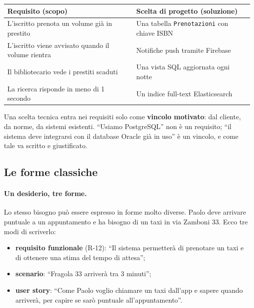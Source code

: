 \documentclass[12pt]{extarticle}
\begin{document}
\begin{center}
\small
\begin{tabular}{p{7.4cm}p{7.4cm}}
    \toprule
    \textbf{Requisito (scopo)} & \textbf{Scelta di progetto (soluzione)} \\
    \midrule
    L'iscritto prenota un volume già in prestito & Una tabella \texttt{Prenotazioni} con chiave ISBN \\
    \addlinespace
    L'iscritto viene avvisato quando il volume rientra & Notifiche push tramite Firebase \\
    \addlinespace
    Il bibliotecario vede i prestiti scaduti & Una vista SQL aggiornata ogni notte \\
    \addlinespace
    La ricerca risponde in meno di 1 secondo & Un indice full-text Elasticsearch \\
    \bottomrule
\end{tabular}
\end{center}

\noindent Una scelta tecnica entra nei requisiti solo come \textbf{vincolo motivato}: dal cliente, da norme, da sistemi esistenti. ``Usiamo PostgreSQL'' non è un requisito; ``il sistema deve integrarsi con il database Oracle già in uso'' è un vincolo, e come tale va scritto e giustificato.

\subsection{Le forme classiche}

\paragraph{Un desiderio, tre forme.}
Lo stesso bisogno può essere espresso in forme molto diverse. Paolo deve arrivare puntuale a un appuntamento e ha bisogno di un taxi in via Zamboni 33. Ecco tre modi di scriverlo:

\begin{itemize}
    \item \textbf{requisito funzionale} (R-12): ``Il sistema permetterà di prenotare un taxi e di ottenere una stima del tempo di attesa'';
    \item \textbf{scenario}: ``Fragola 33 arriverà tra 3 minuti'';
    \item \textbf{user story}: ``Come Paolo voglio chiamare un taxi dall'app e sapere quando arriverà, per capire se sarò puntuale all'appuntamento''.
\end{itemize}
\end{document}
